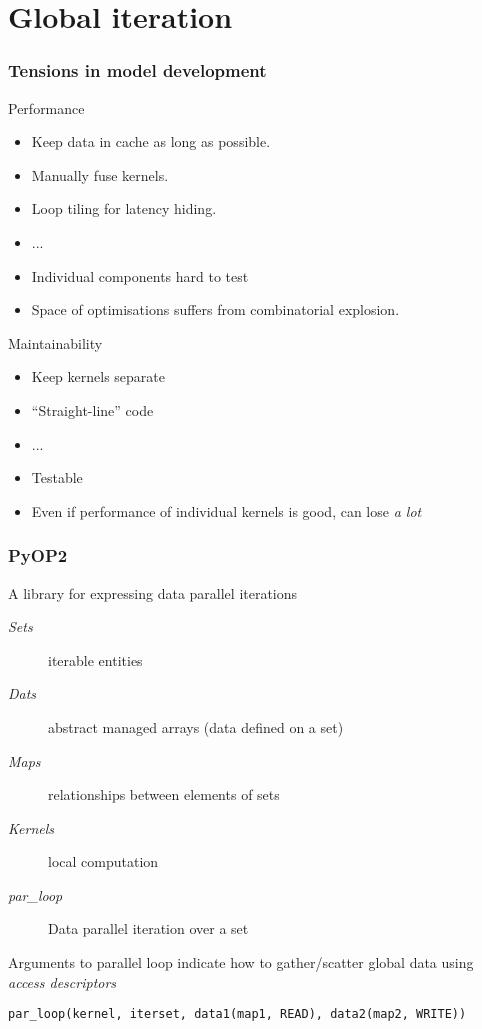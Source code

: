 \documentclass[presentation]{beamer}
\begin{document}
\section{Global iteration}

\begin{frame}[allowframebreaks]
  \frametitle{Tensions in model development}

  \begin{block}{Performance}
    \begin{itemize}
    \item Keep data in cache as long as possible.  
    \item Manually fuse kernels.
    \item Loop tiling for latency hiding.
    \item ...
    \item Individual components hard to test
    \item Space of optimisations suffers from combinatorial
      explosion.
    \end{itemize}
  \end{block}

\pagebreak
  \begin{block}{Maintainability}
    \begin{itemize}
    \item Keep kernels separate
    \item ``Straight-line'' code
    \item ...
    \item Testable
    \item Even if performance of individual kernels is good, can lose
      \emph{a lot}
    \end{itemize}
  \end{block}

\end{frame}

\begin{frame}[fragile]
  \frametitle{PyOP2}
  A library for expressing data parallel iterations
\begin{description}
\item[{\emph{Sets}}] iterable entities
\item[{\emph{Dats}}] abstract managed arrays (data defined on a set)
\item[{\emph{Maps}}] relationships between elements of sets
\item[{\emph{Kernels}}] local computation
\item[{\emph{par\_loop}}] Data parallel iteration over a set
\end{description}
Arguments to parallel loop indicate how to gather/scatter global
data using \emph{access descriptors}

\begin{verbatim}
par_loop(kernel, iterset, data1(map1, READ), data2(map2, WRITE))
\end{verbatim}
\end{frame}
\end{document}
